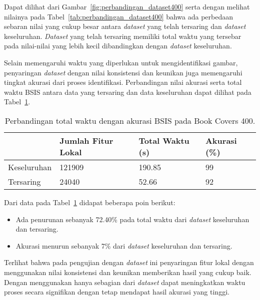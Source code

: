 Dapat dilihat dari Gambar~\ref{fig:perbandingan_dataset400} serta dengan melihat nilainya pada Tabel~\ref{tab:perbandingan_dataset400} bahwa ada perbedaan sebaran nilai yang cukup besar antara \textit{dataset} yang telah tersaring dan \textit{dataset} keseluruhan. \textit{Dataset} yang telah tersaring memiliki total waktu yang tersebar pada nilai-nilai yang lebih kecil dibandingkan dengan \textit{dataset} keseluruhan. 

Selain memengaruhi waktu yang diperlukan untuk mengidentifikasi gambar, penyaringan \textit{dataset} dengan nilai konsistensi dan keunikan juga memengaruhi tingkat akurasi dari proses identifikasi. Perbandingan nilai akurasi serta total waktu BSIS antara data yang tersaring dan data keseluruhan dapat dilihat pada Tabel~\ref{tab:waktu_akurasi_dataset400}.
\begin{table}[H]
	\centering
	\begin{tabular}{|l|l|l|l|}
		\hline
		& \textbf{Jumlah Fitur Lokal} & \textbf{Total Waktu (s)} & \textbf{Akurasi (\%)} \\ \hline
		Keseluruhan & 121909 & 190.85                   & 99                    \\ \hline
		Tersaring   & 24040 & 52.66                    & 92                    \\ \hline
	\end{tabular}
	\caption{Perbandingan total waktu dengan akurasi BSIS pada Book Covers 400.}
	\label{tab:waktu_akurasi_dataset400}
\end{table}
Dari data pada Tabel~\ref{tab:waktu_akurasi_dataset400} didapat beberapa poin berikut:
\begin{itemize}
	\item Ada penurunan sebanyak 72.40\% pada total waktu dari \textit{dataset} keseluruhan dan tersaring.
	\item Akurasi menurun sebanyak 7\% dari \textit{dataset} keseluruhan dan tersaring.
\end{itemize}
Terlihat bahwa pada pengujian dengan \textit{dataset} ini penyaringan fitur lokal dengan menggunakan nilai konsistensi dan keunikan memberikan hasil yang cukup baik. Dengan menggunakan hanya sebagian dari \textit{dataset} dapat meningkatkan waktu proses secara signifikan dengan tetap mendapat hasil akurasi yang tinggi.

